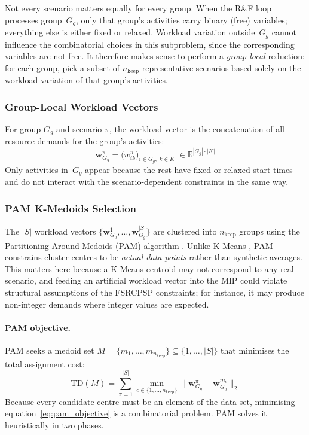 Not every scenario matters equally for every group. When the
R\&F loop processes group~$G_g$, only that group's activities
carry binary (free) variables; everything else is either fixed
or relaxed. Workload variation outside~$G_g$ cannot influence
the combinatorial choices in this subproblem, since the
corresponding variables are not free. It therefore makes sense
to perform a \emph{group-local} reduction: for each group, pick
a subset of $n_{\mathrm{keep}}$ representative scenarios based
solely on the workload variation of that group's activities.

\subsubsection*{Group-Local Workload Vectors}

For group $G_g$ and scenario $\pi$, the workload vector is the
concatenation of all resource demands for the group's activities:
\begin{equation}
    \mathbf{w}_{G_g}^{\pi} =
    \bigl(w_{ik}^{\pi}\bigr)_{i \in G_g,\; k \in K}
    \;\in \mathbb{R}^{|G_g| \cdot |K|}
    \label{eq:scen_vec}
\end{equation}
Only activities in~$G_g$ appear because the rest have fixed or
relaxed start times and do not interact with the
scenario-dependent constraints in the same way.

\subsubsection*{PAM K-Medoids Selection}

The $|S|$ workload vectors
$\{\mathbf{w}_{G_g}^{1}, \ldots, \mathbf{w}_{G_g}^{|S|}\}$ are
clustered into $n_{\mathrm{keep}}$ groups using the Partitioning
Around Medoids (PAM) algorithm \parencite{Kaufman1990medoids}.
Unlike K-Means \parencite{MacQueen1967}, PAM constrains cluster
centres to be \emph{actual data points} rather than synthetic
averages. This matters here because a K-Means centroid may not
correspond to any real scenario, and feeding an artificial
workload vector into the MIP could violate structural assumptions
of the FSRCPSP constraints; for instance, it may produce non-integer
demands where integer values are expected.

\paragraph{PAM objective.}
PAM seeks a medoid set
$M = \{m_1, \ldots, m_{n_{\mathrm{keep}}}\} \subseteq
\{1, \ldots, |S|\}$ that minimises the total assignment cost:
\begin{equation}
    \mathrm{TD}(M) =
    \sum_{\pi=1}^{|S|}
    \min_{c \in \{1,\ldots,n_{\mathrm{keep}}\}}
    \bigl\|\mathbf{w}_{G_g}^{\pi} -
           \mathbf{w}_{G_g}^{m_c}\bigr\|_2
    \label{eq:pam_objective}
\end{equation}
Because every candidate centre must be an element of the data
set, minimising equation~\eqref{eq:pam_objective} is a
combinatorial problem. PAM solves it heuristically in two
phases.

